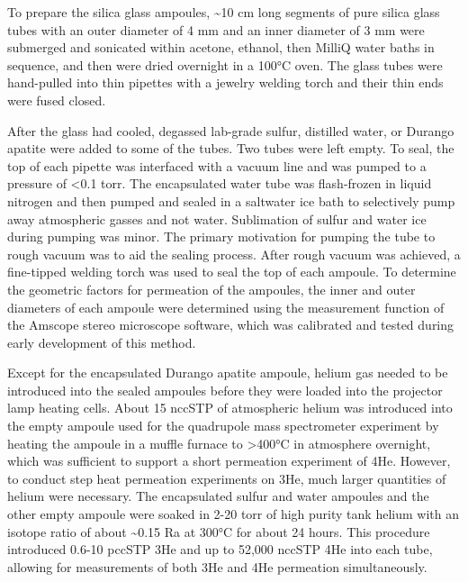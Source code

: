 To prepare the silica glass ampoules, \textasciitilde10 cm long segments of pure silica glass tubes with an outer diameter of 4 mm and an inner diameter of 3 mm were submerged and sonicated within acetone, ethanol, then MilliQ water baths in sequence, and then were dried overnight in a 100°C oven. The glass tubes were hand-pulled into thin pipettes with a jewelry welding torch and their thin ends were fused closed.

After the glass had cooled, degassed lab-grade sulfur, distilled water, or Durango apatite were added to some of the tubes. Two tubes were left empty. To seal, the top of each pipette was interfaced with a vacuum line and was pumped to a pressure of \textless0.1 torr. The encapsulated water tube was flash-frozen in liquid nitrogen and then pumped and sealed in a saltwater ice bath to selectively pump away atmospheric gasses and not water. Sublimation of sulfur and water ice during pumping was minor. The primary motivation for pumping the tube to rough vacuum was to aid the sealing process. After rough vacuum was achieved, a fine-tipped welding torch was used to seal the top of each ampoule. To determine the geometric factors for permeation of the ampoules, the inner and outer diameters of each ampoule were determined using the measurement function of the Amscope stereo microscope software, which was calibrated and tested during early development of this method.

Except for the encapsulated Durango apatite ampoule, helium gas needed to be introduced into the sealed ampoules before they were loaded into the projector lamp heating cells. About 15 nccSTP of atmospheric helium was introduced into the empty ampoule used for the quadrupole mass spectrometer experiment by heating the ampoule in a muffle furnace to \textgreater400°C in atmosphere overnight, which was sufficient to support a short permeation experiment of 4He. However, to conduct step heat permeation experiments on 3He, much larger quantities of helium were necessary. The encapsulated sulfur and water ampoules and the other empty ampoule were soaked in 2-20 torr of high purity tank helium with an isotope ratio of about \textasciitilde0.15 Ra at 300°C for about 24 hours. This procedure introduced 0.6-10 pccSTP 3He and up to 52,000 nccSTP 4He into each tube, allowing for measurements of both 3He and 4He permeation simultaneously.

